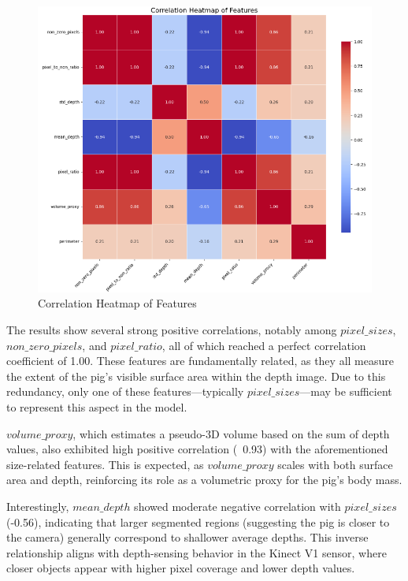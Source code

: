 \begin{figure}[h]
	\centering
	\includegraphics[height=0.6\textheight]{figures/Correlation Heatmap of Features}
	\caption{Correlation Heatmap of Features}
	\label{fig:Correlation Heatmap of Features}
\end{figure}

The results show several strong positive correlations, notably among $pixel\_sizes$, $non\_zero\_pixels$, and $pixel\_ratio$, all of which reached a perfect correlation coefficient of 1.00. These features are fundamentally related, as they all measure the extent of the pig’s visible surface area within the depth image. Due to this redundancy, only one of these features—typically $pixel\_sizes$—may be sufficient to represent this aspect in the model.

$volume\_proxy$, which estimates a pseudo-3D volume based on the sum of depth values, also exhibited high positive correlation (~0.93) with the aforementioned size-related features. This is expected, as $volume\_proxy$ scales with both surface area and depth, reinforcing its role as a volumetric proxy for the pig's body mass.

Interestingly, $mean\_depth$ showed moderate negative correlation with $pixel\_sizes$ (-0.56), indicating that larger segmented regions (suggesting the pig is closer to the camera) generally correspond to shallower average depths. This inverse relationship aligns with depth-sensing behavior in the Kinect V1 sensor, where closer objects appear with higher pixel coverage and lower depth values.

